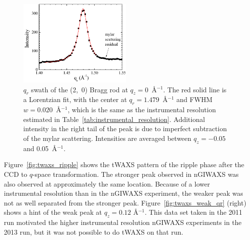 \begin{figure}[htbp]
  \centering
  \includegraphics[width=0.5\textwidth]{figures/ripple/tWAXS/twaxs_gel_qr_20}
  \caption[$q_r$ swath of the (2,~0) Bragg rod at $q_z=0$~\AA$^{-1}$]
  {$q_r$ swath of the (2,~0) Bragg rod at $q_z=0$~\AA$^{-1}$.
  The red solid line is a Lorentzian fit, with the center at $q_r=1.479$~\AA$^{-1}$
  and FWHM $w=0.020$~\AA$^{-1}$, which is the same as the instrumental resolution
  estimated in Table~\ref{tab:instrumental_resolution}.
  Additional intensity in the right tail of the peak is due to imperfect subtraction
  of the mylar scattering.
  Intensities are averaged between $q_z=-0.05$ and 0.05~\AA$^{-1}$.}
  \label{fig:twaxs_gel_qr}
\end{figure}

Figure~\ref{fig:twaxs_ripple} shows the tWAXS pattern of the ripple phase 
after the CCD to $q$-space transformation. The stronger
peak observed in nGIWAXS was also observed at approximately the same location.
Because of a lower instrumental resolution than in the nGIWAXS experiment,
the weaker peak was not as well separated from the stronger peak. 
Figure~\ref{fig:twaxs_weak_qr} (right) shows
a hint of the weak peak at $q_z=0.12$ \AA$^{-1}$. This
data set taken in the 2011 run motivated
the higher instrumental resolution nGIWAXS experiments
in the 2013 run, but it was not possible to do tWAXS on that run.

